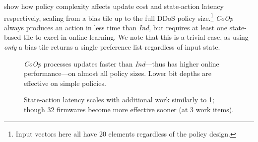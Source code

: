 \documentclass[
conference
,10pt
]{IEEEtran}
\newcommand{\Coopfw}{\emph{CoOp}}
\newcommand{\Indfw}{\emph{Ind}}
\begin{document}
 show how policy complexity affects update cost and state-action latency respectively, scaling from a bias tile up to the full DDoS policy size.\footnote{Input vectors here all have 20 elements regardless of the policy design.}
\Coopfw{} always produces an action in less time than \Indfw{}, but requires at least one state-based tile to excel in online learning.
We note that this is a trivial case, as using \emph{only} a bias tile returns a single preference list regardless of input state.

\begin{figure}[t]
	\centering
	\caption{\Coopfw{} processes updates faster than \Indfw{}---thus has higher online performance---on almost all policy sizes. Lower bit depths are effective on simple policies.\label{fig:vary-work}}
\end{figure}

\begin{figure}
	\centering
	\caption{State-action latency scales with additional work similarly to \cref{fig:vary-work}; though \SI{32}{\bit} firmwares become more effective sooner (at \num{3} work items).\label{fig:vary-work-latency}}
\end{figure}
\end{document}
